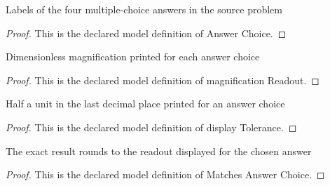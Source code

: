 \begin{definition}
  \label{def:physics:phyx-mini-0041:phyxminiproblems-problemphyxmini0041-answerchoice}
  Labels of the four multiple-choice answers in the source problem
\end{definition}
\begin{proof}
  This is the declared model definition of Answer Choice.
\end{proof}
\begin{definition}
  \label{def:physics:phyx-mini-0041:phyxminiproblems-problemphyxmini0041-answerchoice-magnificationreadout}
  Dimensionless magnification printed for each answer choice
\end{definition}
\begin{proof}
  This is the declared model definition of magnification Readout.
\end{proof}
\begin{definition}
  \label{def:physics:phyx-mini-0041:phyxminiproblems-problemphyxmini0041-answerchoice-displaytolerance}
  Half a unit in the last decimal place printed for an answer choice
\end{definition}
\begin{proof}
  This is the declared model definition of display Tolerance.
\end{proof}
\begin{definition}
  \label{def:physics:phyx-mini-0041:phyxminiproblems-problemphyxmini0041-matchesanswerchoice}
  The exact result rounds to the readout displayed for the chosen answer
\end{definition}
\begin{proof}
  This is the declared model definition of Matches Answer Choice.
\end{proof}

